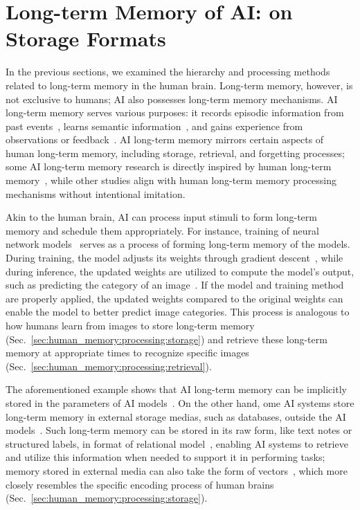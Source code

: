 \documentclass[journal,hideappendix]{vgtc}
\begin{document}
\section{Long-term Memory of AI: on Storage Formats}
\label{sec:founddation_ai_memory}

In the previous sections, we examined the hierarchy and processing methods related to long-term memory in the human brain. Long-term memory, however, is not exclusive to humans; AI also possesses long-term memory mechanisms. AI long-term memory serves various purposes: it records episodic information from past events~\cite{jilan2024egoInstructor,andrew2007episodic}, learns semantic information~\cite{wenhu2022reimage,yang2023care}, and gains experience from observations or feedback~\cite{shinn2024reflexion,zhao2024expel}. AI long-term memory mirrors certain aspects of human long-term memory, including storage, retrieval, and forgetting processes; some AI long-term memory research is directly inspired by human long-term memory~\cite{wang2016semantic,cheng2022xmem,song2023moviechat,das2024larimar,fountas2024human}, while other studies align with human long-term memory processing mechanisms without intentional imitation.

Akin to the human brain, AI can process input stimuli to form long-term memory and schedule them appropriately. For instance, training of neural network models~\cite{lu2007survey,he2016deep} serves as a process of forming long-term memory of the models. During training, the model adjusts its weights through gradient descent~\cite{ruder2016overview}, while during inference, the updated weights are utilized to compute the model's output, such as predicting the category of an image~\cite{he2016deep,li2021survey}. If the model and training method are properly applied, the updated weights compared to the original weights can enable the model to better predict image categories. This process is analogous to how humans learn from images to store long-term memory (Sec.~\ref{sec:human_memory:processing:storage}) and retrieve these long-term memory at appropriate times to recognize specific images (Sec.~\ref{sec:human_memory:processing:retrieval}).

The aforementioned example shows that AI long-term memory can be implicitly stored in the parameters of AI models~\cite{petroni2019language,robertsetal2020much}. 
On the other hand, ome AI systems store long-term memory in external storage medias, such as databases, outside the AI models~\cite{hu2023chatdb,zhang2023long,shen2023encode}. 
Such long-term memory can be stored in its raw form, like text notes or structured labels, in format of relational model~\cite{hu2023chatdb,luo2023chatkbqa}, enabling AI systems to retrieve and utilize this information when needed to support it in performing tasks;
memory stored in external media can also take the form of vectors~\cite{zhang2023long,he2024g}, which more closely resembles the specific encoding process of human brains~\cite{tulving1973encoding} (Sec.~\ref{sec:human_memory:processing:storage}).
\end{document}

